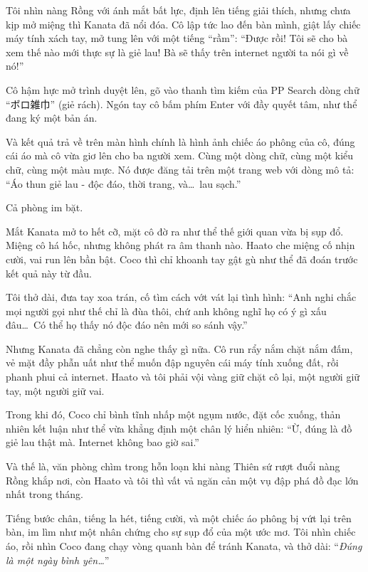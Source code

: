 \documentclass[../main.tex]{subfiles}
\begin{document}
Tôi nhìn nàng Rồng với ánh mắt bất lực, định lên tiếng giải thích, nhưng chưa kịp mở miệng thì Kanata đã nổi đóa. Cô lập tức lao đến bàn mình, giật lấy chiếc máy tính xách tay, mở tung lên với một tiếng ``rầm'': ``Được rồi! Tôi sẽ cho bà xem thế nào mới thực sự là giẻ lau! Bà sẽ thấy trên internet người ta nói gì về nó!''

Cô hậm hực mở trình duyệt lên, gõ vào thanh tìm kiếm của PP Search dòng chữ ``ボロ雑巾'' (giẻ rách). Ngón tay cô bấm phím Enter với đầy quyết tâm, như thể đang ký một bản án.

Và kết quả trả về trên màn hình chính là hình ảnh chiếc áo phông của cô, đúng cái áo mà cô vừa giơ lên cho ba người xem. Cùng một dòng chữ, cùng một kiểu chữ, cùng một màu mực. Nó được đăng tải trên một trang web với dòng mô tả: ``Áo thun giẻ lau - độc đáo, thời trang, và\dots\ lau sạch.''


Cả phòng im bặt.

Mắt Kanata mở to hết cỡ, mặt cô đờ ra như thể thế giới quan vừa bị sụp đổ. Miệng cô há hốc, nhưng không phát ra âm thanh nào. Haato che miệng cố nhịn cười, vai run lên bần bật. Coco thì chỉ khoanh tay gật gù như thể đã đoán trước kết quả này từ đầu.

Tôi thở dài, đưa tay xoa trán, cố tìm cách vớt vát lại tình hình: ``Anh nghi chắc mọi người gọi như thế chỉ là đùa thôi, chứ anh không nghĩ họ có ý gì xấu đâu\dots\ Có thể họ thấy nó độc đáo nên mới so sánh vậy.''

Nhưng Kanata đã chẳng còn nghe thấy gì nữa. Cô run rẩy nắm chặt nắm đấm, vẻ mặt đầy phẫn uất như thể muốn đập nguyên cái máy tính xuống đất, rồi phanh phui cả internet. Haato và tôi phải vội vàng giữ chặt cô lại, một người giữ tay, một người giữ vai.

Trong khi đó, Coco chỉ bình tĩnh nhấp một ngụm nước, đặt cốc xuống, thản nhiên kết luận như thể vừa khẳng định một chân lý hiển nhiên: ``Ừ, đúng là đồ giẻ lau thật mà. Internet không bao giờ sai.''

Và thế là, văn phòng chìm trong hỗn loạn khi nàng Thiên sứ rượt đuổi nàng Rồng khắp nơi, còn Haato và tôi thì vất vả ngăn cản một vụ đập phá đồ đạc lớn nhất trong tháng.

Tiếng bước chân, tiếng la hét, tiếng cười, và một chiếc áo phông bị vứt lại trên bàn, im lìm như một nhân chứng cho sự sụp đổ của một ước mơ. Tôi nhìn chiếc áo, rồi nhìn Coco đang chạy vòng quanh bàn để tránh Kanata, và thở dài: ``\textit{Đúng là một ngày bình yên\dots}''
\end{document}
